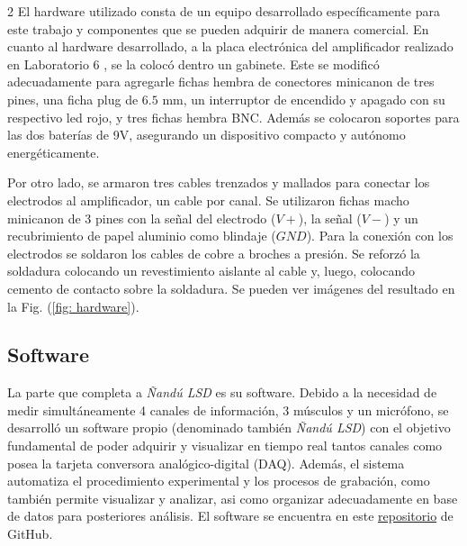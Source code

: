 \documentclass[11pt, letterpaper]{article}
\begin{document}
\begin{multicols*}{2}
El hardware utilizado consta de un equipo desarrollado específicamente para este trabajo y componentes que se pueden adquirir de manera comercial. En cuanto al hardware desarrollado, a la placa electrónica del amplificador realizado en Laboratorio 6 \cite{informeLabo6}, se la colocó dentro un gabinete. Este se modificó adecuadamente para agregarle fichas hembra de conectores minicanon de tres pines, una ficha plug de $6.5$ mm,  un interruptor de encendido y apagado con su respectivo led rojo, y tres fichas hembra BNC. Además se colocaron soportes para las dos baterías de 9V, asegurando un dispositivo compacto y autónomo energéticamente.

Por otro lado, se armaron tres cables trenzados y mallados para conectar los electrodos al amplificador, un cable por canal. Se utilizaron fichas macho minicanon de 3 pines con la señal  del electrodo ($V+$), la señal  ($V-$) y un recubrimiento de papel aluminio como blindaje ($GND$). Para la conexión con los electrodos se soldaron los cables de cobre a broches a presión. Se reforzó la soldadura colocando un revestimiento aislante al cable y, luego, colocando cemento de contacto sobre la soldadura. Se pueden ver imágenes del resultado en la Fig. (\ref{fig: hardware}).

\subsection{Software}

La parte que completa a \textit{Ñandú LSD} es su software. Debido a la necesidad de medir simultáneamente 4 canales de información, 3 músculos y un micrófono, se desarrolló un software propio (denominado también \textit{Ñandú LSD}) con el objetivo fundamental de poder adquirir y visualizar en tiempo real tantos canales como posea la tarjeta conversora analógico-digital (DAQ). Además, el sistema automatiza el procedimiento experimental y los procesos de grabación, %
como también permite visualizar y analizar, asi como organizar adecuadamente en base de datos para posteriores análisis. El software se encuentra en este \href{https://github.com/santiagopradorodriguez/Nandu_SistemadeAdqusicionEMG}{repositorio} de GitHub.



\end{multicols*}
\end{document}
